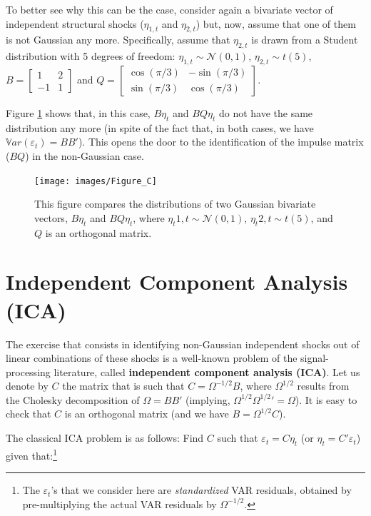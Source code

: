 \documentclass[
  12pt,
]{book}
\theoremstyle{definition}
\theoremstyle{definition}
\theoremstyle{definition}
\theoremstyle{definition}
\theoremstyle{remark}
\begin{document}
To better see why this can be the case, consider again a bivariate vector of independent structural shocks (\(\eta_{1,t}\) and \(\eta_{2,t}\)) but, now, assume that one of them is not Gaussian any more. Specifically, assume that \(\eta_{2,t}\) is drawn from a Student distribution with 5 degrees of freedom:
\(\eta_{1,t} \sim \mathcal{N}(0,1)\), \(\eta_{2,t} \sim t(5)\),
\(B = \left[\begin{array}{cc}
1 & 2 \\
-1 & 1
\end{array}\right]\) and
\(Q = \left[\begin{array}{cc}
\cos(\pi/3) & -\sin(\pi/3) \\
\sin(\pi/3) & \cos(\pi/3)
\end{array}\right]\).

Figure \ref{fig:preMadeFigureICAGaussianStudent} shows that, in this case, \(B \eta_t\) and \(BQ\eta_t\) do not have the same distribution any more (in spite of the fact that, in both cases, we have \(\mathbb{V}ar(\varepsilon_t)=BB'\)). This opens the door to the identification of the impulse matrix (\(BQ\)) in the non-Gaussian case.

\begin{figure}
\texttt{[image: images/Figure\_C]} \caption{This figure compares the distributions of two Gaussian bivariate vectors, $B \eta_t$ and $BQ\eta_t$, where $\eta_t{1,t} \sim \mathcal{N}(0,1)$, $\eta_t{2,t} \sim t(5)$, and $Q$  is an orthogonal matrix.}\label{fig:preMadeFigureICAGaussianStudent}
\end{figure}

\section{Independent Component Analysis (ICA)}\label{independent-component-analysis-ica}

The exercise that consists in identifying non-Gaussian independent shocks out of linear combinations of these shocks is a well-known problem of the signal-processing literature, called \textbf{independent component analysis (ICA)}. Let us denote by \(C\) the matrix that is such that \(C = \Omega^{-1/2}B\), where \(\Omega^{1/2}\) results from the Cholesky decomposition of \(\Omega = BB'\) (implying, \(\Omega^{1/2}{\Omega^{1/2}}'=\Omega\)). It is easy to check that \(C\) is an orthogonal matrix (and we have \(B = \Omega^{1/2}C\)).

The classical ICA problem is as follows: Find \(C\) such that \(\varepsilon_t = C \eta_t\) (or \(\eta_t = C'\varepsilon_t\)) given that:\footnote{The \(\varepsilon_t\)'s that we consider here are \emph{standardized} VAR residuals, obtained by pre-multiplying the actual VAR residuals by \(\Omega^{-1/2}\).}
\end{document}
